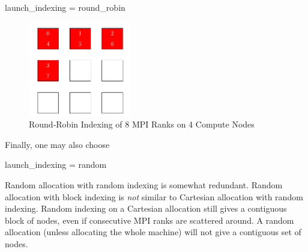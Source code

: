 \begin{ViFile}
launch_indexing = round_robin
\end{ViFile}
\begin{figure}[h]
\centering
\includegraphics[width=0.4\textwidth]{figures/tikz/indexing/roundrobin.pdf}
\caption{Round-Robin Indexing of 8 MPI Ranks on 4 Compute Nodes}
\label{fig:indexing:round_robin}
\end{figure}
Finally, one may also choose

\begin{ViFile}
launch_indexing = random
\end{ViFile}
Random allocation with random indexing is somewhat redundant.  
Random allocation with block indexing is \emph{not} similar to Cartesian allocation with random indexing.
Random indexing on a Cartesian allocation still gives a contiguous block of nodes,
even if consecutive MPI ranks are scattered around.
A random allocation (unless allocating the whole machine) will not give a contiguous set of nodes.
